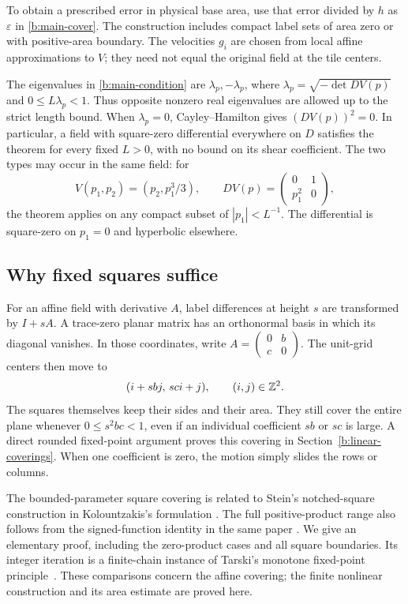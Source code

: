 To obtain a prescribed error in physical base area, use that error
divided by $h$ as $\varepsilon$ in \eqref{b:main-cover}. The construction
includes compact label sets of area zero or with positive-area boundary.
The velocities $g_i$ are chosen from local affine approximations to $V$;
they need not equal the original field at the tile centers.

The eigenvalues in \eqref{b:main-condition} are
$\lambda_p,-\lambda_p$, where $\lambda_p=\sqrt{-\det DV(p)}$ and
$0\le L\lambda_p<1$. Thus opposite nonzero real eigenvalues are
allowed up to the strict length bound. When $\lambda_p=0$,
Cayley--Hamilton gives $(DV(p))^2=0$. In particular, a field with
square-zero differential everywhere on $D$ satisfies the theorem for
every fixed $L>0$, with no bound on its shear coefficient. The two types
may occur in the same field: for
\[
 V(p_1,p_2)=(p_2,p_1^3/3),\qquad
 DV(p)=\begin{pmatrix}0&1\\p_1^2&0\end{pmatrix},
\]
the theorem applies on any compact subset of $|p_1|<L^{-1}$.
The differential is square-zero on $p_1=0$ and hyperbolic elsewhere.

\subsection{Why fixed squares suffice}
For an affine field with derivative $A$, label differences at height
$s$ are transformed by $I+sA$. A trace-zero planar matrix has an
orthonormal basis in which its diagonal vanishes. In those coordinates,
write $A=\left(\begin{smallmatrix}0&b\\c&0\end{smallmatrix}\right)$.
The unit-grid centers then move to
\[
 (i+sbj,\,sci+j),\qquad(i,j)\in\mathbb Z^2.
\]
The squares themselves keep their sides and their area. They still
cover the entire plane whenever $0\le s^2bc<1$, even if an individual
coefficient $sb$ or $sc$ is large. A direct rounded fixed-point argument
proves this covering in Section~\ref{b:linear-coverings}. When one
coefficient is zero, the motion simply slides the rows or columns.

The bounded-parameter square covering is related to Stein's
notched-square construction in Kolountzakis's formulation
\cite[Theorem~7]{Kolountzakis1998}. The full positive-product range also
follows from the signed-function identity in the same paper
\cite[Section~2.3, equations~(17)--(20)]{Kolountzakis1998}.
We give an elementary proof, including the zero-product cases and all
square boundaries. Its integer iteration is a finite-chain instance of
Tarski's monotone fixed-point principle~\cite[Theorem~1]{Tarski1955}.
These comparisons concern the affine covering; the finite nonlinear
construction and its area estimate are proved here.

